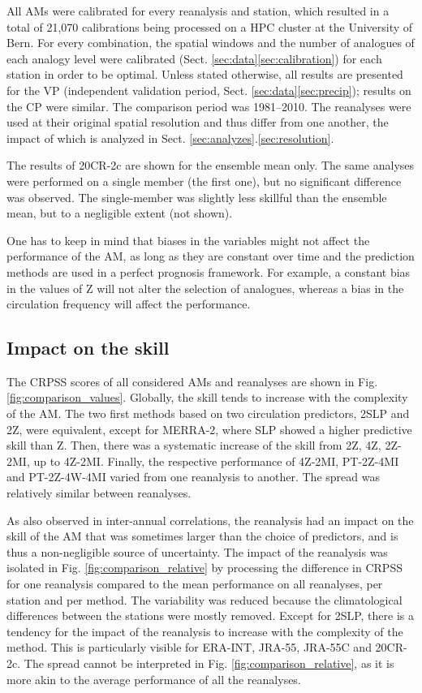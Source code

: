 \documentclass{ametsoc}
\begin{document}
	All AMs were calibrated for every reanalysis and station, which resulted in a total of 21,070 calibrations being processed on a HPC cluster at the University of Bern. For every combination, the spatial windows and the number of analogues of each analogy level were calibrated (Sect. \ref{sec:data}\ref{sec:calibration}) for each station in order to be optimal. Unless stated otherwise, all results are presented for the VP (independent validation period, Sect. \ref{sec:data}\ref{sec:precip}); results on the CP were similar. The comparison period was 1981--2010. The reanalyses were used at their original spatial resolution and thus differ from one another, the impact of which is analyzed in Sect. \ref{sec:analyzes}.\ref{sec:resolution}.
	
	The results of 20CR-2c are shown for the ensemble mean only. The same analyses were performed on a single member (the first one), but no significant difference was observed. The single-member was slightly less skillful than the ensemble mean, but to a negligible extent (not shown).
	
	One has to keep in mind that biases in the variables might not affect the performance of the AM, as long as they are constant over time and the prediction methods are used in a perfect prognosis framework. For example, a constant bias in the values of Z will not alter the selection of analogues, whereas a bias in the circulation frequency will affect the performance.
	
	
	\subsection{Impact on the skill}
	
	The CRPSS scores of all considered AMs and reanalyses are shown in Fig. \ref{fig:comparison_values}. Globally, the skill tends to increase with the complexity of the AM. The two first methods based on two circulation predictors, 2SLP and 2Z, were equivalent, except for MERRA-2, where SLP showed a higher predictive skill than Z. Then, there was a systematic increase of the skill from 2Z, 4Z, 2Z-2MI, up to 4Z-2MI. Finally, the respective performance of 4Z-2MI, PT-2Z-4MI and PT-2Z-4W-4MI varied from one reanalysis to another. The spread was relatively similar between reanalyses.
	
	As \citet{Dayon2015} also observed in inter-annual correlations, the reanalysis had an impact on the skill of the AM that was sometimes larger than the choice of predictors, and is thus a non-negligible source of uncertainty. The impact of the reanalysis was isolated in Fig. \ref{fig:comparison_relative} by processing the difference in CRPSS for one reanalysis compared to the mean performance on all reanalyses, per station and per method. The variability was reduced because the climatological differences between the stations were mostly removed. Except for 2SLP, there is a tendency for the impact of the reanalysis to increase with the complexity of the method. This is particularly visible for ERA-INT, JRA-55, JRA-55C and 20CR-2c. The spread cannot be interpreted in Fig. \ref{fig:comparison_relative}, as it is more akin to the average performance of all the reanalyses.
	
\end{document}
